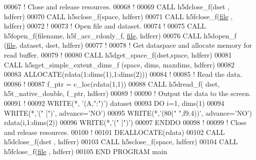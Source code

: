 \begin{DoxyCode}
00067   \textcolor{comment}{! Close and release resources.}
00068   \textcolor{comment}{!}
00069   \textcolor{keyword}{CALL }h5dclose\_f(dset , hdferr)
00070   \textcolor{keyword}{CALL }h5sclose\_f(space, hdferr)
00071   \textcolor{keyword}{CALL }h5fclose\_f(\hyperlink{structfile}{file} , hdferr)
00072   \textcolor{comment}{!}
00073   \textcolor{comment}{! Open file and dataset.}
00074   \textcolor{comment}{!}
00075   \textcolor{keyword}{CALL }h5fopen\_f(filename, h5f\_acc\_rdonly\_f, \hyperlink{structfile}{file}, hdferr)
00076   \textcolor{keyword}{CALL }h5dopen\_f (\hyperlink{structfile}{file}, dataset, dset, hdferr)
00077   \textcolor{comment}{!}
00078   \textcolor{comment}{! Get dataspace and allocate memory for read buffer.}
00079   \textcolor{comment}{!}
00080   \textcolor{keyword}{CALL }h5dget\_space\_f(dset,space, hdferr)
00081   \textcolor{keyword}{CALL }h5sget\_simple\_extent\_dims\_f (space, dims, maxdims, hdferr)
00082 
00083   \textcolor{keyword}{ALLOCATE}(rdata(1:dims(1),1:dims(2)))
00084   \textcolor{comment}{!}
00085   \textcolor{comment}{! Read the data.}
00086   \textcolor{comment}{!}
00087   f\_ptr = c\_loc(rdata(1,1))
00088   \textcolor{keyword}{CALL }h5dread\_f( dset, h5t\_native\_double, f\_ptr, hdferr)
00089   \textcolor{comment}{!}
00090   \textcolor{comment}{! Output the data to the screen.}
00091   \textcolor{comment}{!}
00092   \textcolor{keyword}{WRITE}(*, \textcolor{stringliteral}{'(A,":")'}) dataset
00093   \textcolor{keywordflow}{DO} i=1, dims(1)
00094      \textcolor{keyword}{WRITE}(*,\textcolor{stringliteral}{'(" [")'}, advance=\textcolor{stringliteral}{'NO'})
00095      \textcolor{keyword}{WRITE}(*,\textcolor{stringliteral}{'(80(" ",f9.4))'}, advance=\textcolor{stringliteral}{'NO'}) rdata(i,1:dims(2))
00096      \textcolor{keyword}{WRITE}(*,\textcolor{stringliteral}{'(" ]")'})
00097 \textcolor{keywordflow}{  ENDDO}
00098   \textcolor{comment}{!}
00099   \textcolor{comment}{! Close and release resources.}
00100   \textcolor{comment}{!}
00101   \textcolor{keyword}{DEALLOCATE}(rdata)
00102   \textcolor{keyword}{CALL }h5dclose\_f(dset , hdferr)
00103   \textcolor{keyword}{CALL }h5sclose\_f(space, hdferr)
00104   \textcolor{keyword}{CALL }h5fclose\_f(\hyperlink{structfile}{file} , hdferr)
00105 \textcolor{keyword}{END PROGRAM }main
\end{DoxyCode}
